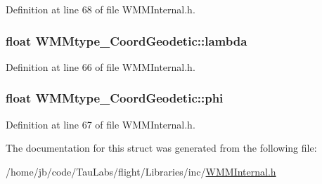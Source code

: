 \-Definition at line 68 of file \-W\-M\-M\-Internal.\-h.

\hypertarget{struct_w_m_mtype___coord_geodetic_aaf9acfaad6b8964779cbd7f0bfa96170}{
\subsubsection[{lambda}]{\setlength{\rightskip}{0pt plus 5cm}float {\bf \-W\-M\-Mtype\-\_\-\-Coord\-Geodetic\-::lambda}}}\label{struct_w_m_mtype___coord_geodetic_aaf9acfaad6b8964779cbd7f0bfa96170}


\-Definition at line 66 of file \-W\-M\-M\-Internal.\-h.

\hypertarget{struct_w_m_mtype___coord_geodetic_a830561cbe026055e7aadb6c004b31f08}{
\subsubsection[{phi}]{\setlength{\rightskip}{0pt plus 5cm}float {\bf \-W\-M\-Mtype\-\_\-\-Coord\-Geodetic\-::phi}}}\label{struct_w_m_mtype___coord_geodetic_a830561cbe026055e7aadb6c004b31f08}


\-Definition at line 67 of file \-W\-M\-M\-Internal.\-h.



\-The documentation for this struct was generated from the following file\-:\begin{DoxyCompactItemize}
\item 
/home/jb/code/\-Tau\-Labs/flight/\-Libraries/inc/\hyperlink{_w_m_m_internal_8h}{\-W\-M\-M\-Internal.\-h}\end{DoxyCompactItemize}
